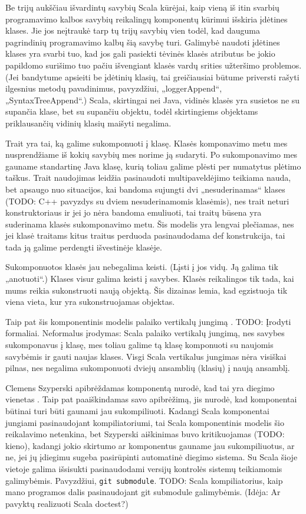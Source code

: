 Be trijų aukščiau išvardintų savybių Scala kūrėjai, kaip vieną iš
itin svarbių programavimo kalbos savybių reikalingų komponentų kūrimui
išskiria įdėtines klases. Jie jos neįtraukė tarp tų trijų
savybių vien todėl, kad dauguma pagrindinių programavimo kalbų
šią savybę turi\cite[12p.]{scalable-component-abstractions}.
Galimybė naudoti įdėtines klases yra svarbi tuo, kad jos gali pasiekti
tėvinės klasės atributus be jokio papildomo surišimo tuo pačiu
išvengiant klasės vardų srities užteršimo problemos. (Jei bandytume
apsieiti be įdėtinių klasių, tai greičiausiai būtume priversti
rašyti ilgesnius metodų pavadinimus, pavyzdžiui, „loggerAppend“,
„SyntaxTreeAppend“.) Scala, skirtingai nei Java, vidinės
 klasės yra susietos ne su supančia klase, bet su supančiu
objektu, todėl skirtingiems objektams priklausančių vidinių
klasių maišyti negalima.

Trait yra tai, ką galime sukomponuoti į klasę. Klasės komponavimo
metu mes nusprendžiame iš kokių savybių mes norime ją sudaryti.
Po sukomponavimo mes gauname standartinę Java klasę, kurią
toliau galime plėsti per numatytus plėtimo taškus. Trait naudojimas
leidžia pasinaudoti multipaveldėjimo teikiama nauda, bet apsaugo
nuo situacijos, kai bandoma sujungti dvi „nesuderinamas“ klases
(TODO: C++ pavyzdys su dviem nesuderinamomis klasėmis), nes
trait neturi konstruktoriaus ir jei jo nėra bandoma emuliuoti,
tai traitų būsena yra suderinama klasės sukomponavimo metu. Šis
modelis yra lengvai plečiamas, nes jei klasė traitams kitus traitus
perduoda pasinaudodama def konstrukcija, tai tada ją galime perdengti
išvestinėje klasėje.

Sukomponuotos klasės jau nebegalima keisti. (Lįsti į jos vidų. Ją galima
tik „anotuoti“.) Klases visur galima keisti į savybes. Klasės reikalingos
tik tada, kai mums reikia sukonstruoti naują objektą. Šis dizainas
lemia, kad egzistuoja tik viena vieta, kur yra sukonstruojamas objektas.

Taip pat šis komponentinis modelis palaiko vertikalų jungimą
\cite[598p.]{classification-framework-for-scm}.
TODO: Įrodyti formaliai. Neformalus įrodymas: Scala palaiko vertikalų
jungimą, nes savybes sukomponavus į klasę, mes toliau galime tą
klasę komponuoti su naujomis savybėmis ir gauti naujas klases.
Visgi Scala vertikalus jungimas nėra visiškai pilnas, nes negalima
sukomponuoti dviejų ansamblių (klasių) į naują ansamblį.

Clemens Szyperski apibrėždamas
komponentą\cite{cs-beyond-object-oriented-programming} nurodė, kad tai
yra diegimo vienetas . Taip pat paaiškindamas
savo apibrėžimą, jis nurodė, kad komponentai būtinai turi būti
gaunami jau sukompiliuoti. Kadangi Scala komponentai jungiami
pasinaudojant kompiliatoriumi, tai Scala komponentinis modelis
šio reikalavimo netenkina, bet Szyperski aiškinimas buvo kritikuojamas
(TODO: kieno), kadangi jokio skirtumo ar komponentus gauname
jau sukompiliuotus, ar ne, jei jų įdiegimu sugeba pasirūpinti
automatinė diegimo sistema. Su Scala šioje vietoje galima išsisukti
pasinaudodami versijų kontrolės sistemų teikiamomis galimybėmis.
Pavyzdžiui, \verb|git submodule|.
TODO: Scala kompiliatorius, kaip mano programos dalis pasinaudojant git
submodule galimybėmis. (Idėja: Ar pavyktų realizuoti Scala doctest?)

